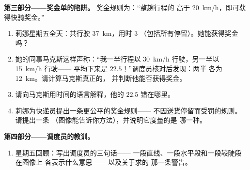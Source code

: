 \begin{problem}
\medskip\noindent\textbf{第三部分——奖金单的陷阱。}
奖金规则为：“整趟行程的
高于 \qty{20}{km/h}，即可获得快骑奖金。”
\begin{enumerate}[resume]
  \item 莉娜星期五全天：共行驶 \qty{37}{km}，用时 $3$ 
        （包括所有停留）。她能获得奖金吗？
  \item 她的同事马克斯这样声称：“我一半行程以
        \qty{30}{km/h} 行驶，另一半以 \qty{15}{km/h} 行驶——
        平均下来是 $22.5$！”调度员核对后发现：两半
        各为 \qty{12}{km}。请计算马克斯真正的，
        并判断他能否获得奖金。
  \item 请向马克斯用时间的语言解释，他的 $22.5$
        错在哪里。
  \item 莉娜为快递员提出一条更公平的奖金规则——
        不因送货停留而受罚的规则。请提出一条
        （图像能告诉你方法），并说明它度量的是
        哪一种。
\end{enumerate}

\medskip\noindent\textbf{第四部分——调度员的教训。}
\begin{enumerate}[resume]
  \item 星期五回顾：写出调度员的三句话——
        一段直线、一段水平段和一段较陡段在图像上
        各表示什么意思——
        以及关于求的
        那一条警告。
\end{enumerate}
\end{problem}

